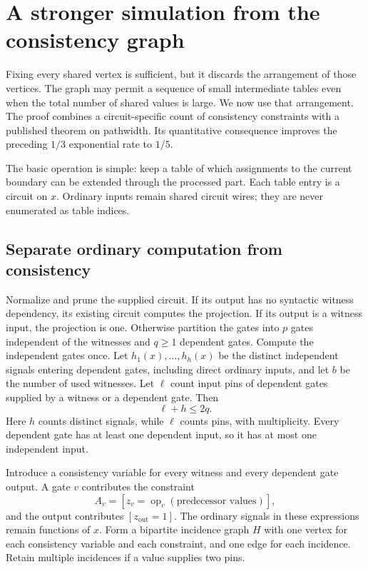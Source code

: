 \section{A stronger simulation from the consistency graph}
\label{sec:consistency-graph}

Fixing every shared vertex is sufficient, but it discards the arrangement
of those vertices. The graph may permit a sequence of small intermediate
tables even when the total number of shared values is large. We now use
that arrangement. The proof combines a circuit-specific count of consistency
constraints with a published theorem on pathwidth. Its quantitative
consequence improves the preceding $1/3$ exponential rate to $1/5$.

The basic operation is simple: keep a table of which assignments to the
current boundary can be extended through the processed part. Each table
entry is a circuit on $x$. Ordinary inputs remain shared circuit wires;
they are never enumerated as table indices.

\subsection{Separate ordinary computation from consistency}

Normalize and prune the supplied circuit. If its output has no syntactic
witness dependency, its existing circuit computes the projection. If its
output is a witness input, the projection is one. Otherwise partition the
gates into $p$ gates independent of the witnesses and $q\ge1$ dependent
gates. Compute the independent gates once. Let
$h_1(x),\ldots,h_h(x)$ be the distinct independent signals entering
dependent gates, including direct ordinary inputs, and let $b$ be the
number of used witnesses. Let $\ell$ count input pins of dependent
gates supplied by a witness or a dependent gate. Then
\begin{equation}\label{eq:core-pins}
 \ell+h\le2q.
\end{equation}
Here $h$ counts distinct signals, while $\ell$ counts pins, with
multiplicity. Every dependent gate has at least one dependent input,
so it has at most one independent input.

Introduce a consistency variable for every witness and every dependent
gate output. A gate $v$ contributes the constraint
\[
 A_v=[z_v=\operatorname{op}_v(\text{predecessor values})],
\]
and the output contributes $[z_{\mathrm{out}}=1]$. The ordinary
signals in these expressions remain functions of $x$. Form a bipartite
incidence graph $H$ with one vertex for each consistency variable and
each constraint, and one edge for each incidence. Retain multiple
incidences if a value supplies two pins.

